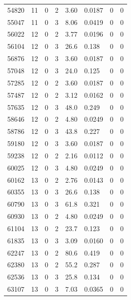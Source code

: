 \documentclass[preview]{standalone}
\begin{document}
{{{{{{{{\begin{tabular}{L{1.2cm}C{1.2cm} C{0.3cm}C{0.5cm} C{1.4cm}C{1.4cm} C{1.4cm}C{1.4cm}}
  54820  &    11  & 0     &  2 &  3.60  & 0.0187  & 0 &  0   \\ 
  55047  &    11  & 0     &  3 &  8.06  & 0.0419  & 0 &  0   \\ 
  56022  &    12  & 0     &  2 &  3.77  & 0.0196  & 0 &  0   \\ 
  56104  &    12  & 0     &  3 &  26.6  & 0.138  & 0 &  0   \\ 
  56876  &    12  & 0     &  3 &  3.60  & 0.0187  & 0 &  0   \\ 
  57048  &    12  & 0     &  3 &  24.0  & 0.125  & 0 &  0   \\ 
  57285  &    12  & 0     &  2 &  3.60  & 0.0187  & 0 &  0   \\ 
  57487  &    12  & 0     &  2 &  3.12  & 0.0162  & 0 &  0   \\ 
  57635  &    12  & 0     &  3 &  48.0  & 0.249  & 0 &  0   \\ 
  58646  &    12  & 0     &  2 &  4.80  & 0.0249  & 0 &  0   \\ 
  58786  &    12  & 0     &  3 &  43.8  & 0.227  & 0 &  0   \\ 
  59180  &    12  & 0     &  3 &  3.60  & 0.0187  & 0 &  0   \\ 
  59238  &    12  & 0     &  2 &  2.16  & 0.0112  & 0 &  0   \\ 
  60025  &    12  & 0     &  3 &  4.80  & 0.0249  & 0 &  0   \\ 
  60162  &    13  & 0     &  2 &  2.76  & 0.0143  & 0 &  0   \\ 
  60355  &    13  & 0     &  3 &  26.6  & 0.138  & 0 &  0   \\ 
  60790  &    13  & 0     &  3 &  61.8  & 0.321  & 0 &  0   \\ 
  60930  &    13  & 0     &  2 &  4.80  & 0.0249  & 0 &  0   \\ 
  61104  &    13  & 0     &  2 &  23.7  & 0.123  & 0 &  0   \\ 
  61835  &    13  & 0     &  3 &  3.09  & 0.0160  & 0 &  0   \\ 
  62247  &    13  & 0     &  2 &  80.6  & 0.419  & 0 &  0   \\ 
  62380  &    13  & 0     &  2 &  55.2  & 0.287  & 0 &  0   \\ 
  62536  &    13  & 0     &  3 &  25.8  & 0.134  & 0 &  0   \\ 
  63107  &    13  & 0     &  3 &  7.03  & 0.0365  & 0 &  0   \\ 
\hline 
\end{tabular} 

}}}}}}}}
\end{document}
